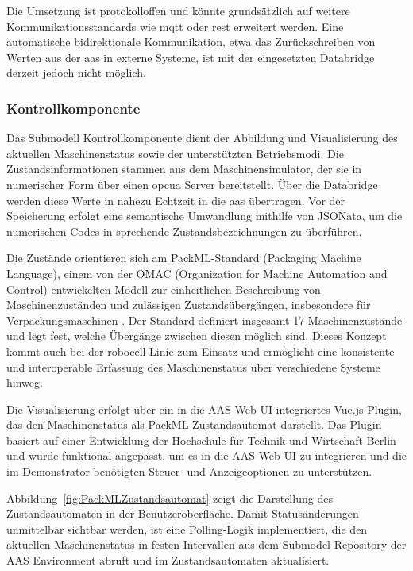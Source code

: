 Die Umsetzung ist protokolloffen und könnte grundsätzlich auf weitere Kommunikationsstandards wie \acs{mqtt} oder \acs{rest} erweitert werden.
Eine automatische bidirektionale Kommunikation, etwa das Zurückschreiben von Werten aus der \acs{aas} in externe Systeme, ist mit der eingesetzten Databridge derzeit jedoch nicht möglich.

\subsubsection*{Kontrollkomponente}
\vspace{-0.5em}
Das Submodell Kontrollkomponente dient der Abbildung und Visualisierung des aktuellen Maschinenstatus sowie der unterstützten Betriebsmodi.
Die Zustandsinformationen stammen aus dem Maschinensimulator, der sie in numerischer Form über einen \acs{opcua} Server bereitstellt.
Über die Databridge werden diese Werte in nahezu Echtzeit in die \acs{aas} übertragen.
Vor der Speicherung erfolgt eine semantische Umwandlung mithilfe von JSONata, um die numerischen Codes in sprechende Zustandsbezeichnungen zu überführen.

Die Zustände orientieren sich am PackML-Standard (Packaging Machine Language), einem von der OMAC (Organization for Machine Automation and Control) entwickelten Modell zur einheitlichen Beschreibung von Maschinenzuständen und zulässigen Zustandsübergängen, insbesondere für Verpackungsmaschinen \cite{OMAC}. 
Der Standard definiert insgesamt 17 Maschinenzustände und legt fest, welche Übergänge zwischen diesen möglich sind. 
Dieses Konzept kommt auch bei der robocell-Linie zum Einsatz und ermöglicht eine konsistente und interoperable Erfassung des Maschinenstatus über verschiedene Systeme hinweg.

Die Visualisierung erfolgt über ein in die AAS Web UI integriertes Vue.js-Plugin, das den Maschinenstatus als PackML-Zustandsautomat darstellt.
Das Plugin basiert auf einer Entwicklung der Hochschule für Technik und Wirtschaft Berlin \cite{HTW1, HTW2} und wurde funktional angepasst, um es in die AAS Web UI zu integrieren und die im Demonstrator benötigten Steuer- und Anzeigeoptionen zu unterstützen.

Abbildung~\ref{fig:PackMLZustandsautomat} zeigt die Darstellung des Zustandsautomaten in der Benutzeroberfläche.
Damit Statusänderungen unmittelbar sichtbar werden, ist eine Polling-Logik implementiert, die den aktuellen Maschinenstatus in festen Intervallen aus dem Submodel Repository der AAS Environment abruft und im Zustandsautomaten aktualisiert.

